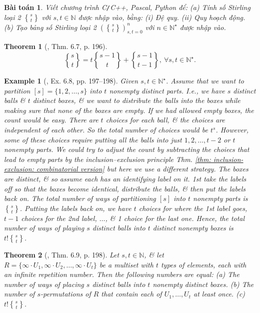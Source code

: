 \documentclass[oneside]{book}
\newtheorem{baitoan}{Bài toán}
\newtheorem{example}{Example}
\newtheorem{theorem}{Theorem}
\newcommand{\genstirlingII}[3]{%
	\genfrac{\{}{\}}{0pt}{#1}{#2}{#3}%
}
\newcommand{\stirlingII}[2]{\genstirlingII{}{#1}{#2}}
\begin{document}
\begin{baitoan}
	Viết chương trình {\sf C{\tt/}C++, Pascal, Python} để: (a) Tính số Stirling loại 2 $\stirlingII{s}{t}$ với $s,t\in\mathbb{N}$ được nhập vào, bằng: (i) Đệ quy. (ii) Quy hoạch động. (b) Tạo bảng số Stirling loại 2 $\left(\stirlingII{s}{t}\right)_{s,t=0}^{n}$ với $n\in\mathbb{N}^\star$ được nhập vào.
\end{baitoan}

\begin{theorem}[\cite{Shahriari2022}, Thm. 6.7, p. 196]
	\begin{equation*}
		\stirlingII{s}{t} = t\stirlingII{s - 1}{t} + \stirlingII{s - 1}{t - 1},\ \forall s,t\in\mathbb{N}^\star.
	\end{equation*}
\end{theorem}

\begin{example}[\cite{Shahriari2022}, Ex. 6.8, pp. 197--198]
	Given $s,t\in\mathbb{N}^\star$. Assume that we want to partition $[s] = \{1,2,\ldots,s\}$ into $t$ nonempty distinct parts. I.e., we have $s$ distinct balls \& $t$ distinct boxes, \& we want to distribute the balls into the boxes while making sure that none of the boxes are empty. If we had allowed empty boxes, the count would be easy. There are $t$ choices for each ball, \& the choices are independent of each other. So the total number of choices would be $t^s$. However, some of these choices require putting all the balls into just $1,2,\ldots,t - 2$ or $t$ nonempty parts. We could try to adjust the count by subtracting the choiecs that lead to empty parts by the inclusion--exclusion principle Thm. \ref{thm: inclusion-exclusion: combinatorial version} but here we use a different strategy. The boxes are distinct, \& so assume each has an identifying label on it. 1st take the labels off so that the boxes become identical, distribute the balls, \& then put the labels back on. The total number of ways of partitioning $[s]$ into $t$ nonempty parts is $\stirlingII{s}{t}$. Putting the labels back on, we have $t$ choices for where the 1st label goes, $t - 1$ choices for the 2nd label, $\ldots$, \& 1 choice for the last one. Hence, the total number of ways of playing $s$ distinct balls into $t$ distinct nonempty boxes is $t!\stirlingII{s}{t}$.
\end{example}

\begin{theorem}[\cite{Shahriari2022}, Thm. 6.9, p. 198]
	Let $s,t\in\mathbb{N}$, \& let $R = \{\infty\cdot U_1,\infty\cdot U_2,\ldots,\infty\cdot U_t\}$ be a multiset with $t$ types of elements, each with an infinite repetition number. Then the following numbers are equal: (a) The number of ways of placing $s$ distinct balls into $t$ nonempty distinct boxes. (b) The number of $s$-permutations of $R$ that contain each of $U_1,\ldots,U_t$ at least once. (c) $t!\stirlingII{s}{t}$.
\end{theorem}
\end{document}
